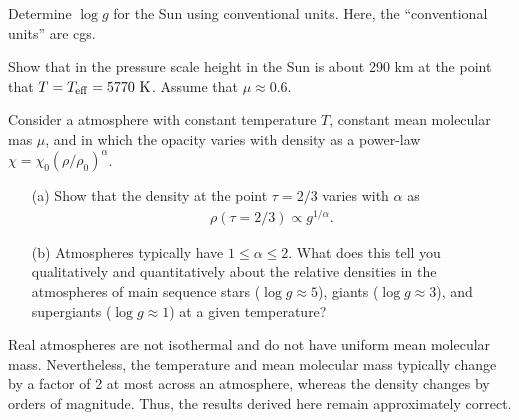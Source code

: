 \problemset

\begin{problem}
Determine $\log g$ for the Sun using conventional units. Here, the “conventional units” are cgs.
\end{problem}

\begin{problem}
\label{problem-solar-scale-height}
Show that in the pressure scale height in the Sun is about 290 km at the point that $T = T_\mathrm{eff} = 5770~\mathrm{K}$. Assume that $\mu \approx 0.6$.
\end{problem}


\begin{problem}
	Consider a atmosphere with constant temperature $T$, constant mean molecular mas $\mu$, and in which the opacity varies with density as a power-law $\chi = \chi_0 (\rho/\rho_0)^\alpha$.
	\begin{enumerate}
		\item[(a)]
		Show that the density at the point $\tau = 2/3$ varies with $\alpha$ as 
		\begin{align}
			\rho(\tau=2/3) \propto g^{1/\alpha}.
		\end{align}
		\item[(b)]
		Atmospheres typically have $1 \le \alpha \le 2$. What does this tell you qualitatively and quantitatively about the relative densities in the atmospheres of main sequence stars ($\log g \approx 5$), giants ($\log g \approx 3$), and supergiants ($\log g \approx 1$) at a given temperature?
	\end{enumerate}
Real atmospheres are not isothermal and do not have uniform mean molecular mass. Nevertheless, the temperature and mean molecular mass typically change by a factor of 2 at most across an atmosphere, whereas the density changes by orders of magnitude. Thus, the results derived here remain approximately correct.
\end{problem}

